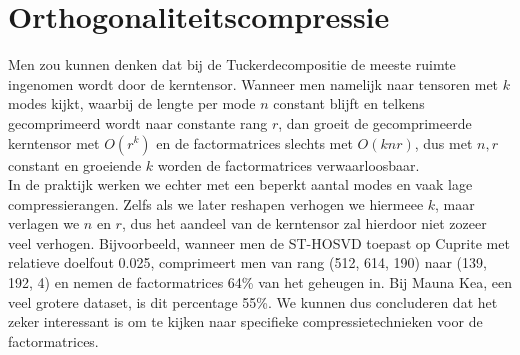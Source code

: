 \section{Orthogonaliteitscompressie}

Men zou kunnen denken dat bij de Tuckerdecompositie de meeste ruimte ingenomen wordt door de kerntensor. Wanneer men namelijk naar tensoren met $k$ modes kijkt, waarbij de lengte per mode $n$ constant blijft en telkens gecomprimeerd wordt naar constante rang $r$, dan groeit de gecomprimeerde kerntensor met $O(r^k)$ en de factormatrices slechts met $O(knr)$, dus met $n, r$ constant en groeiende $k$ worden de factormatrices verwaarloosbaar.\\

In de praktijk werken we echter met een beperkt aantal modes en vaak lage compressierangen. Zelfs als we later reshapen verhogen we hiermeee $k$, maar verlagen we $n$ en $r$, dus het aandeel van de kerntensor zal hierdoor niet zozeer veel verhogen. Bijvoorbeeld, wanneer men de ST-HOSVD toepast op Cuprite met relatieve doelfout 0.025, comprimeert men van rang (512, 614, 190) naar (139, 192, 4) en nemen de factormatrices 64\% van het geheugen in. Bij Mauna Kea, een veel grotere dataset, is dit percentage 55\%. We kunnen dus concluderen dat het zeker interessant is om te kijken naar specifieke compressietechnieken voor de factormatrices.\\

